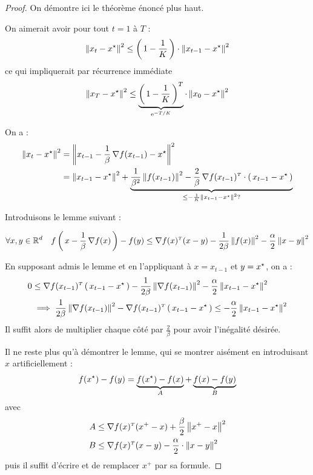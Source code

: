   \begin{proof}
    On démontre ici le théorème énoncé plus haut.

    On aimerait avoir pour tout $t=1$ à $T$ :
    \begin{equation}
      \norme{x_t-\xopt}^2\leq \prt{1- \frac{1}{K}} \cdot \norme{x_{t-1}-\xopt}^2
    \end{equation}
    ce qui impliquerait par récurrence immédiate
    \begin{equation}
      \norme{x_T-\xopt}^2\leq \underbrace{\prt{1- \frac{1}{K}}^T}_{\e^{-T/K}}\cdot \norme{x_{0}-\xopt}^2
    \end{equation}

    On a :
    \begin{align*}
      \norme{x_t-\xopt}^2&= \norme{x_{t-1}-\frac{1}{\beta} \grad f(x_{t-1})-\xopt}^2\\
      &= \norme{x_{t-1}-\xopt}^2+\underbrace{\frac{1}{\beta^2} \norme{f(x_{t-1})}^2-
      \frac{2}{\beta}\transpose{\grad f(x_{t-1})} \cdot \prt{x_{t-1}-\xopt}}_{\leq
      -\frac{1}{K}\norme{x_{t-1}-\xopt}^2?
      }
    \end{align*}

    Introduisons le lemme suivant :
    \begin{lemma}
      \begin{equation}
        \forall x, y \in \R^d \quad f\prt{x-\frac{1}{\beta} \grad f(x)} - f(y)
        \leq \transpose{\grad f(x)} (x-y)-\frac{1}{2 \beta } \norme{f(x)}^2
        - \frac{\alpha}{2} \norme{x-y}^2
      \end{equation}
    \end{lemma}

    En supposant admis le lemme et en l'appliquant à $x = x_{t-1}$ et $y = \xopt$,
    on a :
    \begin{align*}
0 &\leq \transpose{\grad f(x_{t-1})}\prt{x_{t-1}-\xopt}
-\frac{1}{2 \beta} \norme{\grad f(x_{t-1})}^2 - \frac{\alpha}{2} \norme{x_{t-1}-\xopt}^2\\
&\implies \frac{1}{2\beta } \norme{\grad f(x_{t-1})}^2-\transpose{\grad f(x_{t-1})}\prt{x_{t-1}-\xopt} \leq - \frac{\alpha}{2} \norme{x_{t-1}-\xopt}^2
    \end{align*}
Il suffit alors de multiplier chaque côté par $\frac{2}{\beta}$ pour avoir l'inégalité désirée.

Il ne reste plus qu'à démontrer le lemme, qui se montrer aisément en introduisant $x$
artificiellement :
\begin{align*}
  f(\xopt)-f(y)&= \underbrace{f(\xopt)-f(x)}_{A}+
  \underbrace{f(x)-f(y)}_{B}\\
  \end{align*}
  avec
  \begin{align*}
    A &\leq \transpose{\grad f(x)}(x^+-x)+ \frac{\beta}{2} \norme{x^+-x}^2\\
    B &\leq \transpose{\grad f(x)}(x-y)-\frac{\alpha}{2} \cdot \norme{x-y}^2
  \end{align*}
  puis il suffit d'écrire et de remplacer $x^+$ par sa formule.

  \end{proof}
